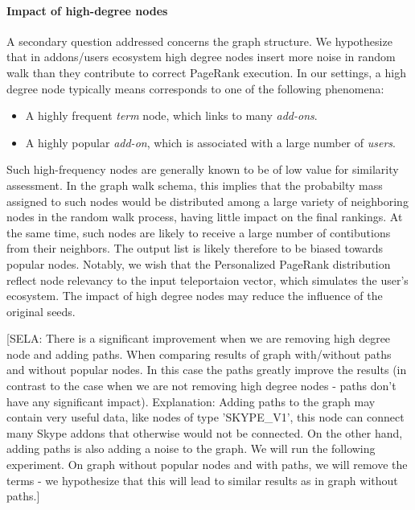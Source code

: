 \documentclass[11pt,oneside]{book}
\begin{document}
\paragraph{Impact of high-degree nodes}

A secondary question addressed concerns the graph structure. We hypothesize that in addons/users ecosystem high degree nodes insert more noise in random walk than they contribute to correct PageRank execution. In our settings, a high degree node typically means corresponds to one of the following phenomena:
\begin{itemize}
\renewcommand{\labelitemiii}{$\diamond$}
\item A highly frequent {\it term} node, which links to many {\it add-ons}. 
\item A highly popular {\it add-on}, which is associated with a large number of {\it users}. 
\end{itemize}
Such high-frequency nodes are generally known to be of low value for similarity assessment. In the graph walk schema, this implies that the probabilty mass assigned to such nodes would be distributed among a large variety of neighboring nodes in the random walk process, having little impact on the final rankings. At the same time, such nodes are likely to receive a large number of contibutions from their neighbors. The output list is likely therefore to be biased towards popular nodes.  
Notably, we wish that the Personalized PageRank distribution reflect node relevancy to the input
teleportaion vector, which simulates the user's ecosystem. The impact of high degree nodes may reduce the
influence of the original seeds.

[SELA: There is a significant improvement when we are removing high degree node and adding paths. When comparing results of graph with/without paths and without popular nodes. In this case the paths greatly improve the results (in contrast to the case when we are not removing high degree nodes - paths don't have any significant impact). Explanation:
Adding paths to the graph may contain very useful data, like nodes of type 'SKYPE\_V1', this node can connect many Skype addons that otherwise would not be connected. On the other hand, adding paths is also adding a noise to the graph. We will run the following experiment. On graph without popular nodes and with paths, we will remove the terms - we hypothesize that this will lead to similar results as in graph without paths.]
\end{document}
